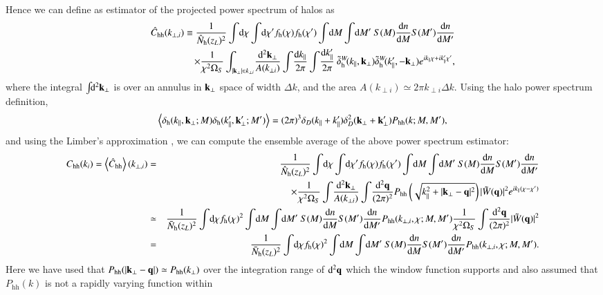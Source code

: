 \documentclass[onecolumn,notitlepage,showpacs,amsmath,amssymb,prd,floatfix]{revtex4-1}
\def\ave#1{\left\langle #1 \right\rangle}
\newcommand{\bk}{{\bf k}}
\newcommand{\bq}{{\bf q}}
\newcommand{\tW}{\tilde{W}}
\newcommand{\dr}{\mathrm{d}}
\newcommand{\tdeltam}{\tilde{\delta}_{\mathrm{m}}}
\newcommand{\deltah}{\delta_{\mathrm{h}}}
\newcommand{\phh}{P_{\mathrm{hh}}}
\newcommand{\chh}{C_{\mathrm{hh}}}
\newcommand{\hchh}{\hat{C}_{\mathrm{hh}}}
\newcommand{\bh}{\mathrm{h}}
\newcommand{\bnh}{\frac{\dr n}{\dr M}}
\newcommand{\bnhd}{\frac{\dr n}{\dr M'}}
\newcommand{\hNh}{\hat{N}_{\rm h}}
\newcommand{\bNh}{\bar{N}_{\rm h}}
\newcommand{\tdeltah}{\tilde{\delta}_{\rm h}}
\begin{document}
Hence we can define as estimator of the projected power spectrum of
halos as
%
\begin{eqnarray}
\hchh(k_{\perp,i})\equiv
 \frac{1}{\hNh(z_L)^2}\int\!\dr\chi\int\!\dr\chi'
 f_\bh(\chi)f_\bh(\chi')
 \int\!\dr M\int\!\dr M'~S(M)\bnh S(M')\bnhd\nonumber\\
 \times
\frac{1}{\chi^2\Omega_S}\int_{|\bk_\perp|\in k_{\perp i}}\!\frac{\dr^2\bk_{\perp}}{A(k_{\perp
i})}\int\!\frac{\dr k_\parallel}{2\pi}\int\!\frac{\dr k'_{\parallel}}{2\pi}
~\tdeltah^W\!(k_\parallel,\bk_\perp)\tdeltah^W\!(k'_\parallel,-\bk_\perp)
e^{ik_\parallel\chi+ik'_\parallel\chi'},
\label{eq:e_chh}
\end{eqnarray}
%
where the integral $\int\!\!\dr^2\bk_\perp$ is over an annulus in
$\bk_\perp$ space of width $\Delta k$, and the area $A(k_{\perp
i})\simeq 2\pi k_{\perp i}\Delta k$.  Using the halo power spectrum
definition,
%
\begin{equation}
 \ave{\deltah(k_\parallel,\bk_\perp;M)\deltah(k'_\parallel,\bk'_{\perp};M')}=(2\pi)^3
  \delta_D(k_\parallel+k'_\parallel)\delta_D^2(\bk_\perp+\bk'_\perp)\phh(k;M,M'), 
\end{equation}
%
and using the Limber's approximation \cite{Limber:54},
we can compute the ensemble
average of the above power spectrum estimator:
%
\begin{eqnarray}
\chh(k_i)=\ave{\hchh}(k_{\perp, i})&=&
   \frac{1}{\hNh(z_L)^2}\int\!\dr\chi\int\!\dr\chi'
 f_\bh(\chi)f_\bh(\chi')
 \int\!\dr M\int\!\dr M'~S(M)\bnh S(M')\bnhd\nonumber\\
&&\hspace{4em} \times
\frac{1}{\chi^2\Omega_S}\int\!\frac{\dr^2\bk_{\perp}}{A(k_{\perp
i})}\int\!\frac{\dr^2\bq}{(2\pi)^2}
\phh\left(\sqrt{k_\parallel^2+|\bk_\perp-\bq|^2}\right)
|\tW(\bq)|^2e^{ik_\parallel(\chi-\chi')}
\nonumber\\
 &\simeq&\frac{1}{\bNh(z_L)^2}\int\!\dr\chi
  f_\bh(\chi)^2\int\!\dr M\int\!\dr M'~S(M)\bnh S(M')\bnhd
  \phh(k_{\perp,i},\chi;M,M')
  \frac{1}{\chi^2\Omega_S}\int\!\frac{\dr^2\bq}{(2\pi)^2}|\tW(\bq)|^2
\nonumber\\
 &=&\frac{1}{\bNh(z_L)^2}\int\!\dr\chi
  f_\bh(\chi)^2\int\!\dr M\int\!\dr M'~S(M)\bnh S(M')\bnhd
  \phh(k_{\perp,i},\chi; M, M').
  \label{eq:ave_hchh}
\end{eqnarray}
%
Here we have used that $\phh(|\bk_\perp-\bq|)\simeq \phh(k_\perp)$ over
the integration range of $\dr^2\bq$ which the window function supports
and also assumed that $\phh(k)$ is not a rapidly varying function within
\end{document}
